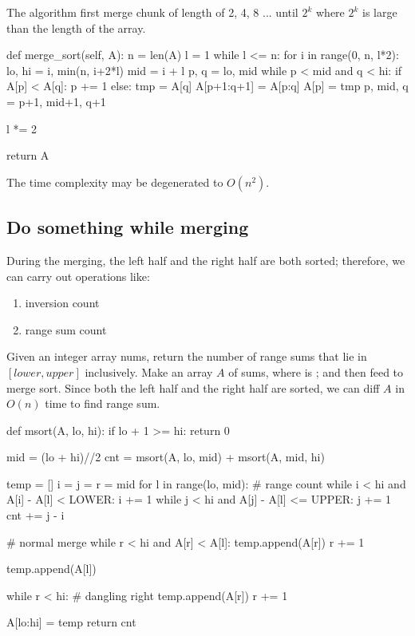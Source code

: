 The algorithm first merge chunk of length of 2, 4, 8 ... until $2^k$ where $2^k$ is large than the length of the array.
\begin{python}
def merge_sort(self, A):
  n = len(A)
  l = 1
  while l <= n:
    for i in range(0, n, l*2):
      lo, hi = i, min(n, i+2*l)
      mid = i + l
      p, q = lo, mid
      while p < mid and q < hi:
        if A[p] < A[q]:
          p += 1
        else:
          tmp = A[q]
          A[p+1:q+1] = A[p:q]
          A[p] = tmp
          p, mid, q = p+1, mid+1, q+1

    l *= 2

  return A
\end{python}
The time complexity may be degenerated to $O(n^2)$. 
\subsection{Do something while merging}
During the merging, the left half and the right half are both sorted; therefore, we can carry out operations like:
\begin{enumerate}
\item inversion count 
\item range sum count 
\end{enumerate}

 Given an integer array nums, return the number of range sums that lie in $[lower, upper]$ inclusively. Make an array $A$ of sums, where  is ; and then feed to merge sort. Since both the left half and the right half are sorted, we can diff $A$ in $O(n)$ time to find range sum. 

\begin{python}
def msort(A, lo, hi):
  if lo + 1 >= hi:
    return 0

  mid = (lo + hi)//2
  cnt = msort(A, lo, mid) + msort(A, mid, hi)

  temp = []
  i = j = r = mid
  for l in range(lo, mid):
    # range count
    while i < hi and A[i] - A[l] <  LOWER: i += 1
    while j < hi and A[j] - A[l] <= UPPER: j += 1
    cnt += j - i

    # normal merge 
    while r < hi and A[r] < A[l]:
      temp.append(A[r])
      r += 1

    temp.append(A[l])

  while r < hi:  # dangling right
    temp.append(A[r])
    r += 1

  A[lo:hi] = temp
  return cnt
\end{python}

